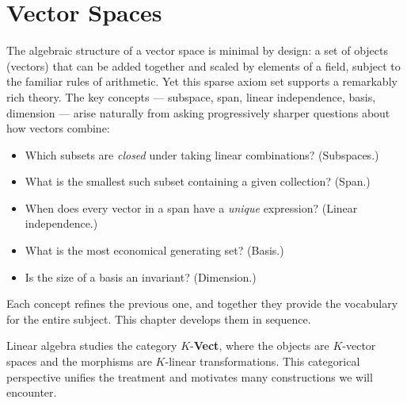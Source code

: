 
\newpage
\section{Vector Spaces}

\begin{intuition}
    The algebraic structure of a vector space is minimal by design: a set of objects (vectors)
    that can be added together and scaled by elements of a field, subject to the familiar rules
    of arithmetic. Yet this sparse axiom set supports a remarkably rich theory. The key concepts
    --- subspace, span, linear independence, basis, dimension --- arise naturally from asking
    progressively sharper questions about how vectors combine:
    \begin{itemize}
        \item Which subsets are \emph{closed} under taking linear combinations? (Subspaces.)
        \item What is the smallest such subset containing a given collection? (Span.)
        \item When does every vector in a span have a \emph{unique} expression? (Linear independence.)
        \item What is the most economical generating set? (Basis.)
        \item Is the size of a basis an invariant? (Dimension.)
    \end{itemize}
    Each concept refines the previous one, and together they provide the vocabulary for the
    entire subject. This chapter develops them in sequence.
\end{intuition}

\begin{remark}
    Linear algebra studies the category $K$-\textbf{Vect}, where the objects are $K$-vector spaces
    and the morphisms are $K$-linear transformations. This categorical perspective unifies the
    treatment and motivates many constructions we will encounter.
\end{remark}

